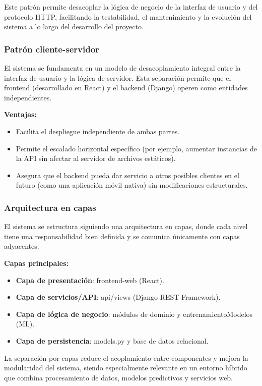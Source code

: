 Este patrón permite desacoplar la lógica de negocio de la interfaz de usuario y
del protocolo HTTP, facilitando la testabilidad, el mantenimiento y la evolución
del sistema a lo largo del desarrollo del proyecto.


\subsubsection{Patrón cliente-servidor}

El sistema se fundamenta en un modelo de desacoplamiento integral entre la
interfaz de usuario y la lógica de servidor. Esta separación permite que el
frontend (desarrollado en React) y el backend (Django) operen como entidades
independientes.

\textbf{Ventajas:}
\begin{itemize}
\item Facilita el despliegue independiente de ambas partes.
\item Permite el escalado horizontal específico (por ejemplo, aumentar instancias
de la API sin afectar al servidor de archivos estáticos).
\item Asegura que el backend pueda dar servicio a otros posibles clientes en el
futuro (como una aplicación móvil nativa) sin modificaciones estructurales.
\end{itemize}


\subsubsection{Arquitectura en capas}

El sistema se estructura siguiendo una arquitectura en capas, donde cada nivel
tiene una responsabilidad bien definida y se comunica únicamente con capas
adyacentes.

\textbf{Capas principales:}
\begin{itemize}
\item \textbf{Capa de presentación}: frontend-web (React).
\item \textbf{Capa de servicios/API}: api/views (Django REST Framework).
\item \textbf{Capa de lógica de negocio}: módulos de dominio y
entrenamientoModelos (ML).
\item \textbf{Capa de persistencia}: models.py y base de datos relacional.
\end{itemize}

La separación por capas reduce el acoplamiento entre componentes y mejora la
modularidad del sistema, siendo especialmente relevante en un entorno híbrido
que combina procesamiento de datos, modelos predictivos y servicios web.


